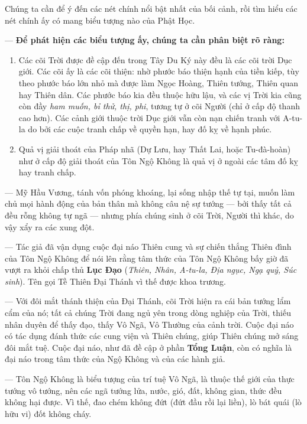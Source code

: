 Chúng ta cần để ý đến các nét chính nổi bật nhất của bối cảnh, rồi tìm hiểu các nét chính ấy có mang biểu tượng nào của Phật Học.

--- {\bf Để phát hiện các biểu tượng ấy, chúng ta cần phân biệt rõ ràng:}

\begin{enumerate}[label=\itshape\alph*\upshape/]

    \item Các cõi Trời được đề cập đến trong Tây Du Ký này đều là các cõi trời Dục giới. Các cõi ấy là các cõi thiện: nhờ phước báo thiện hạnh của tiền kiếp, tùy theo phước báo lớn nhỏ mà được làm Ngọc Hoàng, Thiên tướng, Thiên quan hay Thiên dân. Các phước báo kia đều thuộc hữu lậu, và các vị Trời kia cũng còn đầy \emph{ham muốn, bỉ thử, thị, phi}, tương tự ở cõi Người (chỉ ở cấp độ thanh cao hơn). Các cảnh giới thuộc trời Dục giới vẫn còn nạn chiến tranh với A-tu-la do bởi các cuộc tranh chấp về quyền hạn, hay đố kỵ về hạnh phúc.

    \item Quả vị giải thoát của Pháp nhã (Dự Lưu, hay Thất Lai, hoặc Tu-đà-hoàn) như ở cấp độ giải thoát của Tôn Ngộ Không là quả vị ở ngoài các tâm đố kỵ hay tranh chấp.
\end{enumerate}

--- Mỹ Hầu Vương, tánh vốn phóng khoáng, lại sống nhập thế tự tại, muốn làm chủ mọi hành động của bản thân mà không câu nệ sự tướng --- bởi thấy tất cả đều rỗng không tự ngã --- nhưng phía chúng sinh ở cõi Trời, Người thì khác, do vậy xẩy ra các xung đột.

--- Tác giả đã vận dụng cuộc đại náo Thiên cung và sự chiến thắng Thiên đình của Tôn Ngộ Không để nói lên rằng tâm thức của Tôn Ngộ Không bấy giờ đã vượt ra khỏi chấp thủ {\bf Lục Đạo} (\emph{Thiên, Nhân, A-tu-la, Địa ngục, Ngạ quỷ, Súc sinh}). Tên gọi Tề Thiên Đại Thánh vì thế được khoa trương.

--- Với đôi mắt thánh thiện của Đại Thánh, cõi Trời hiện ra cái bản tướng lẩm cẩm của nó; tất cả chúng Trời đang ngủ yên trong dòng nghiệp của Trời, thiếu nhân duyên để thấy đạo, thấy Vô Ngã, Vô Thường của cảnh trời. Cuộc đại náo có tác dụng đánh thức các cung viện và Thiên chúng, giúp Thiên chúng mở sáng đôi mắt tuệ. Cuộc đại náo, như đã đề cập ở phần \textbf{Tổng Luận}, còn có nghĩa là đại náo trong tâm thức của Ngộ Không và của các hành giả.

--- Tôn Ngộ Không là biểu tượng của trí tuệ Vô Ngã, là thuộc thế giới của thực tướng vô tướng, nên các ngã tướng lửa, nước, gió, đất, không gian, thức đều không hại được. Vì thế, đao chém không đứt (đứt đầu rồi lại liền), lò bát quái (lò hữu vi) đốt không cháy.

